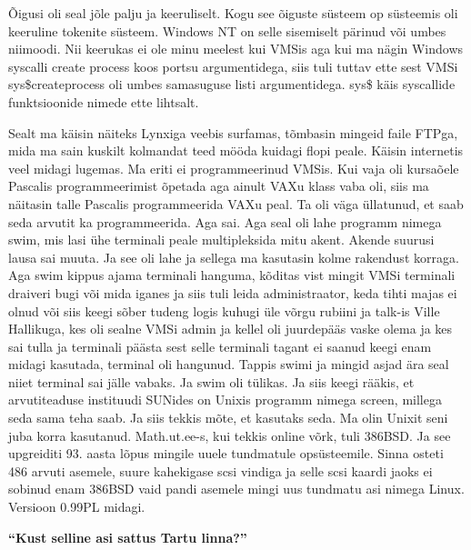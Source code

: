 Õigusi oli seal jõle palju ja keeruliselt. Kogu see õiguste süsteem op süsteemis oli keeruline tokenite süsteem. Windows NT on selle sisemiselt pärinud või umbes niimoodi. Nii keerukas ei ole minu meelest kui VMSis aga kui ma nägin Windows syscalli create process koos portsu argumentidega, siis tuli tuttav ette sest VMSi sys\$createprocess oli umbes samasuguse listi argumentidega. sys\$ käis syscallide funktsioonide nimede ette lihtsalt. 

Sealt ma käisin näiteks Lynxiga veebis surfamas, tõmbasin mingeid faile FTPga, mida ma sain kuskilt kolmandat teed mööda kuidagi flopi peale. Käisin internetis veel midagi lugemas. Ma eriti ei programmeerinud VMSis. Kui vaja oli kursaõele Pascalis programmeerimist õpetada aga ainult VAXu klass vaba oli, siis ma näitasin talle Pascalis programmeerida VAXu peal. Ta oli väga üllatunud, et saab seda arvutit ka programmeerida. Aga sai. Aga seal oli lahe programm nimega swim, mis lasi ühe terminali peale multipleksida mitu akent. Akende suurusi lausa sai muuta. Ja see oli lahe ja sellega ma kasutasin kolme rakendust korraga. Aga swim kippus ajama terminali hanguma, kõditas vist mingit VMSi terminali draiveri bugi või mida iganes ja siis tuli leida administraator, keda tihti majas ei olnud või siis keegi sõber tudeng logis kuhugi üle võrgu rubiini ja talk-is Ville Hallikuga, kes oli sealne VMSi admin ja kellel oli juurdepääs vaske olema ja kes sai tulla ja terminali päästa sest selle terminali tagant ei saanud keegi enam midagi kasutada, terminal oli hangunud. Tappis swimi ja mingid asjad ära seal niiet terminal sai jälle vabaks. Ja swim oli tülikas. Ja siis keegi rääkis, et arvutiteaduse instituudi SUNides on Unixis programm nimega screen, millega seda sama teha saab. Ja siis tekkis mõte, et kasutaks seda. Ma olin Unixit seni juba korra kasutanud. Math.ut.ee-s, kui tekkis online võrk, tuli 386BSD. Ja see upgreiditi 93. aasta lõpus mingile uuele tundmatule opsüsteemile. Sinna osteti 486 arvuti asemele, suure kahekigase scsi vindiga ja selle scsi kaardi jaoks ei sobinud enam 386BSD vaid pandi asemele mingi uus tundmatu asi nimega Linux. Versioon 0.99PL midagi. 

\textbf{\enquote{Kust selline asi sattus Tartu linna?}} 

